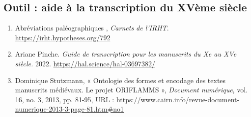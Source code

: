 \documentclass{article}
\begin{document}
\subsection{Outil : aide à la transcription du XVème siècle}
\begin{enumerate}
    \item \og Abréviations paléographiques \fg, \textit{Carnets de l'IRHT}. \url{https://irht.hypotheses.org/792}
    \item Ariane Pinche. \textit{Guide de transcription pour les manuscrits du Xe au XVe siècle.} 2022. \url{https://hal.science/hal-03697382/}
    \item Dominique Stutzmann, « Ontologie des formes et encodage des textes manuscrits médiévaux. Le projet ORIFLAMMS », \textit{Document numérique}, vol. 16, no. 3, 2013, pp. 81-95, URL : \url{https://www.cairn.info/revue-document-numerique-2013-3-page-81.htm\#no1}
\end{enumerate}
\end{document}
